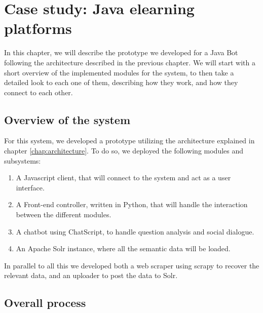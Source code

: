 \chapter{Case study: Java elearning platforms}
\label{chap:usecasejava}

\begin{chapterintro}

In this chapter, we will describe the prototype we developed for a Java Bot following the architecture described in the previous chapter. We will start with a short overview of the implemented modules for the system, to then take a detailed look to each one of them, describing how they work, and how they connect to each other.
 
\end{chapterintro}

\cleardoublepage

\section{Overview of the system}

For this system, we developed a prototype utilizing the architecture explained in chapter \ref{chap:architecture}. To do so, we deployed the following modules and subsystems:

\begin{enumerate}
 \item A Javascript client, that will connect to the system and act as a user interface.
 \item A Front-end controller, written in Python, that will handle the interaction between the different modules.
 \item A chatbot using ChatScript, to handle question analysis and social dialogue.
 \item An Apache Solr instance, where all the semantic data will be loaded.
\end{enumerate}

In parallel to all this we developed both a web scraper using scrapy to recover the relevant data, and an uploader to post the data to Solr.


\section{Overall process}

